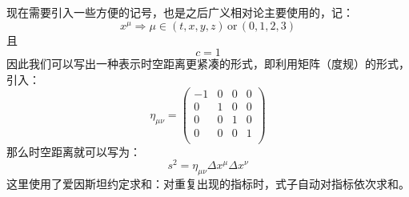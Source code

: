 \documentclass[fontset=windows]{article}
\begin{document}
现在需要引入一些方便的记号，也是之后广义相对论主要使用的，记：
\begin{equation*}
	x^\mu  \Rightarrow \mu \in (t,x,y,z) \,\text{or}\, (0,1,2,3)
\end{equation*}
且
\begin{equation*}
	c = 1
\end{equation*}
因此我们可以写出一种表示时空距离更紧凑的形式，即利用矩阵（度规）的形式，引入：
\begin{equation}
	\eta_{\mu\nu} = 
	\left(
	\begin{array}{cccc}
		-1 & 0 & 0 & 0 \\
		0 & 1 & 0 & 0 \\
		0 & 0 & 1 & 0 \\
		0 & 0 & 0 & 1 \\
	\end{array}
	\right)
\end{equation}
那么时空距离就可以写为：
\begin{equation}
	s^2 = \eta_{\mu\nu}\Delta x^{\mu}\Delta x^{\nu}
\end{equation}
这里使用了爱因斯坦约定求和：对重复出现的指标时，式子自动对指标依次求和。
\end{document}
